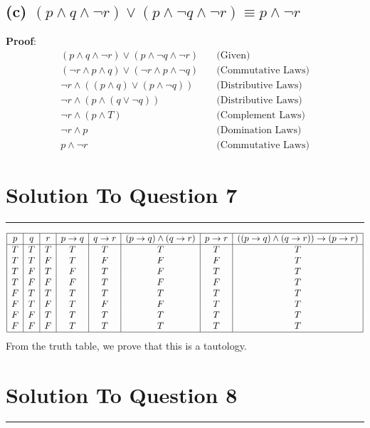 \documentclass{article}
\begin{document}
\subsection*{(c) $(p \land q \land \lnot r) \lor ( p \land \lnot q \land \lnot r) \equiv p \land \lnot r$}
\noindent\textbf{Proof}:
\begin{align*}
(p \land q \land \lnot r) \lor ( p \land \lnot q \land \lnot r) & \quad \text{(Given)}\\
(\lnot r \land p \land q) \lor ( \lnot r \land p \land \lnot q) & \quad \text{(Commutative Laws)}\\
\lnot r \land ((p \land q) \lor (p \land \lnot q)) & \quad \text{(Distributive Laws)}\\
\lnot r \land ( p \land (q \lor \lnot q)) &\quad \text{(Distributive Laws)}\\
\lnot r \land (p \land T) & \quad \text{(Complement Laws)}\\
\lnot r \land p& \quad \text{(Domination Laws)}\\
p \land \lnot r & \quad \text{(Commutative Laws)}
\end{align*}

\section*{Solution To Question 7}
\hrule
\[
\begin{array}{|c|c|c|c|c|c|c|c|}
\hline
p & q & r & p \rightarrow q & q \rightarrow r & (p \rightarrow q) \land (q \rightarrow r) & p \rightarrow r & ((p \rightarrow q) \land (q \rightarrow r)) \rightarrow (p \rightarrow r) \\
\hline
T & T & T & T & T & T & T & T \\
T & T & F & T & F & F & F & T \\
T & F & T & F & T & F & T & T \\
T & F & F & F & T & F & F & T \\
F & T & T & T & T & T & T & T \\
F & T & F & T & F & F & T & T \\
F & F & T & T & T & T & T & T \\
F & F & F & T & T & T & T & T \\
\hline
\end{array}
\]
From the truth table, we prove that this is a tautology.






\section*{Solution To Question 8}
\hrule
\end{document}
